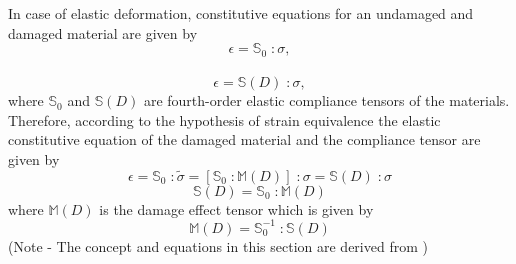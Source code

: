 \documentclass[12pt,openright,twoside]{report}
\begin{document}
In case of elastic deformation, constitutive equations for an undamaged and damaged material are given by
\begin{equation}
\epsilon = \mathbb{S}_{0}\; : \sigma,
\end{equation}\\
\begin{equation}
\epsilon = \mathbb{S}(D)\; : \sigma,
\end{equation}
where $\mathbb{S}_{0}$ and $\mathbb{S}(D)$  are fourth-order elastic compliance tensors of the materials. Therefore, according to the hypothesis of strain equivalence the elastic constitutive equation of the damaged material and the compliance tensor are given by 
\begin{equation}
\epsilon = \mathbb{S}_{0}\; : \tilde{\sigma}  =  [\mathbb{S}_{0}\;: \mathbb{M} (D)]\;: \sigma = \mathbb{S}(D)\; : \sigma
\end{equation}
\begin{equation}
\mathbb{S}(D) = \mathbb{S}_{0}\; : \mathbb{M} (D)
 \label{eqn:S_HSeq}
\end{equation}
where $\mathbb{M} (D)$ is the damage effect tensor which is given by 
\begin{equation}
\mathbb{M} (D)  = \mathbb{S}_{0}^{-1} \; : \mathbb{S}(D) 
\end{equation}
(Note - The concept and equations in this section are derived from \citep{murakami2012continuum})
\end{document}

